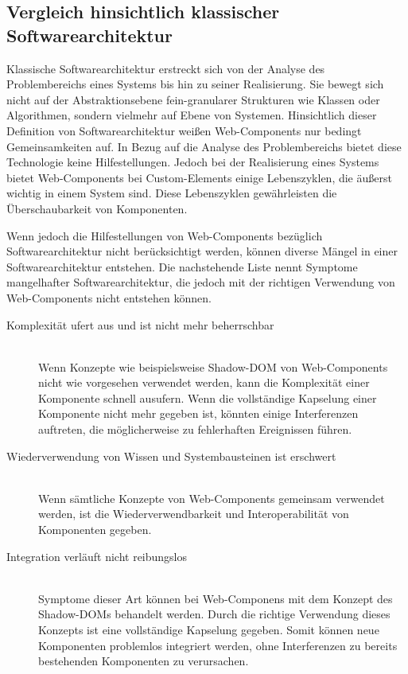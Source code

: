 \subsection{Vergleich hinsichtlich klassischer Softwarearchitektur}
\label{sec:5_Vergleich_Architektur}

Klassische Softwarearchitektur erstreckt sich von der Analyse des Problembereichs eines Systems bis hin zu seiner Realisierung. Sie bewegt sich nicht auf der Abstraktionsebene fein-granularer Strukturen wie Klassen oder Algorithmen, sondern vielmehr auf Ebene von Systemen. Hinsichtlich dieser Definition von Softwarearchitektur weißen Web-Components nur bedingt Gemeinsamkeiten auf. In Bezug auf die Analyse des Problembereichs bietet diese Technologie keine Hilfestellungen. Jedoch bei der Realisierung eines Systems bietet Web-Components bei Custom-Elements einige Lebenszyklen, die äußerst wichtig in einem System sind. Diese Lebenszyklen gewährleisten die Überschaubarkeit von Komponenten.

Wenn jedoch die Hilfestellungen von Web-Components bezüglich Softwarearchitektur nicht berücksichtigt werden, können diverse Mängel in einer Softwarearchitektur entstehen. Die nachstehende Liste nennt Symptome mangelhafter Softwarearchitektur, die jedoch mit der richtigen Verwendung von Web-Components nicht entstehen können.

\begin{description}
\item[Komplexität ufert aus und ist nicht mehr beherrschbar] \hfill \\
Wenn Konzepte wie beispielsweise Shadow-DOM von Web-Components nicht wie vorgesehen verwendet werden, kann die Komplexität einer Komponente schnell ausufern. Wenn die vollständige Kapselung einer Komponente nicht mehr gegeben ist, könnten einige Interferenzen auftreten, die möglicherweise zu fehlerhaften Ereignissen führen.

\item[Wiederverwendung von Wissen und Systembausteinen ist erschwert] \hfill \\
Wenn sämtliche Konzepte von Web-Components gemeinsam verwendet werden, ist die Wiederverwendbarkeit und Interoperabilität von Komponenten gegeben.

\item[Integration verläuft nicht reibungslos] \hfill \\
Symptome dieser Art können bei Web-Componens mit dem Konzept des Shadow-DOMs behandelt werden. Durch die richtige Verwendung dieses Konzepts ist eine vollständige Kapselung gegeben. Somit können neue Komponenten problemlos integriert werden, ohne Interferenzen zu bereits bestehenden Komponenten zu verursachen.
\end{description}

